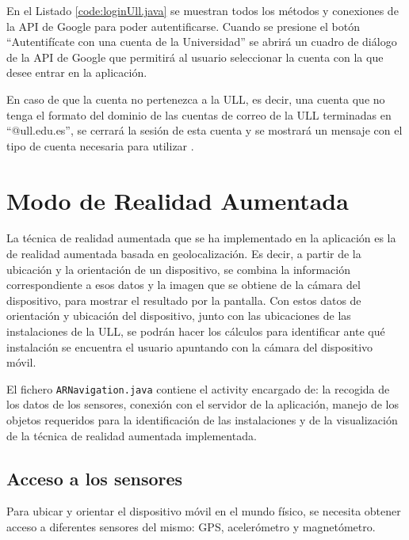 En el Listado \ref{code:loginUll.java} se muestran todos los métodos y conexiones de la API de Google para poder autentificarse. Cuando se presione el botón ``Autentifícate con una cuenta de la Universidad'' se abrirá un cuadro de diálogo de la API de Google que permitirá al usuario seleccionar la cuenta con la que desee entrar en la aplicación. 

\bigskip

En caso de que la cuenta no pertenezca a la ULL, es decir, una cuenta que no tenga el formato del dominio de las cuentas de correo de la ULL terminadas en ``@ull.edu.es'', se cerrará la sesión de esta cuenta y se mostrará un mensaje con el tipo de cuenta necesaria para utilizar  \ULLAR{}.

\bigskip
\bigskip
\bigskip
\bigskip
 
 
\section{Modo de Realidad Aumentada}

La técnica de realidad aumentada que se ha implementado en la aplicación es la de realidad aumentada basada en geolocalización. Es decir, a partir de la ubicación y la orientación de un dispositivo, se combina la información correspondiente a esos datos y la imagen que se obtiene de la cámara del dispositivo, para mostrar el resultado por la pantalla. Con estos datos de orientación y ubicación del dispositivo, junto con las ubicaciones de las instalaciones de la ULL, se podrán hacer los cálculos para identificar ante qué instalación se encuentra el usuario apuntando con la cámara del dispositivo móvil.

El fichero \texttt{ARNavigation.java} contiene el activity encargado de: la recogida de los datos de los sensores, conexión con el servidor de la aplicación, manejo de los objetos requeridos para la identificación de las instalaciones y de la visualización de la técnica de realidad aumentada implementada.

\subsection{Acceso a los sensores}

Para ubicar y orientar el dispositivo móvil en el mundo físico, se necesita obtener acceso a diferentes sensores del mismo: GPS, acelerómetro y magnetómetro. 

